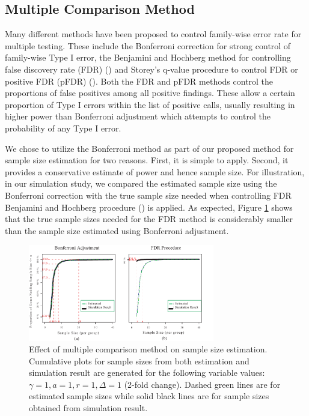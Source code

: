 \documentclass{bioinfo}
\begin{document}
\subsection{Multiple Comparison Method}

Many different methods have been proposed to control family-wise
error rate for multiple testing.  These include the Bonferroni
correction for strong control of family-wise Type I error, the
Benjamini and Hochberg method for controlling false discovery rate
(FDR) (\citealp{Benjamini95}) and Storey's q-value procedure to
control FDR or positive FDR (pFDR) (\citealp{Storey02}).  Both the
FDR and pFDR methods control the proportions of false positives
among all positive findings.  These allow a certain proportion of
Type I errors within the list of positive calls, usually resulting
in higher power than Bonferroni adjustment which attempts to
control the probability of any Type I error.

We chose to utilize the Bonferroni method as part of our proposed
method for sample size estimation for two reasons. First, it is
simple to apply.  Second, it provides a conservative estimate of
power and hence sample size.  For illustration, in our simulation
study, we compared the estimated sample size using the Bonferroni
correction with the true sample size needed when controlling FDR
Benjamini and Hochberg procedure (\citealp{Benjamini95}) is
applied. As expected, Figure \ref{fig:ResMtd} shows that the true
sample sizes needed for the FDR method is considerably smaller
than the sample size estimated using Bonferroni adjustment.

\begin{figure}[h]
  \centerline{\includegraphics*[width=3.2in]{ResMtd.pdf}}
  \caption[Effect of multiple comparison method on sample size estimation]
  {Effect of multiple comparison method on sample size estimation.
    Cumulative plots for sample sizes from both estimation and
    simulation result are generated for the following variable values: $\gamma = 1, a = 1, r = 1,
    \Delta = 1$ (2-fold change). Dashed green lines are for estimated sample sizes
    while solid black lines are for sample sizes obtained from simulation result.}
  \label{fig:ResMtd}
\end{figure}
\end{document}
